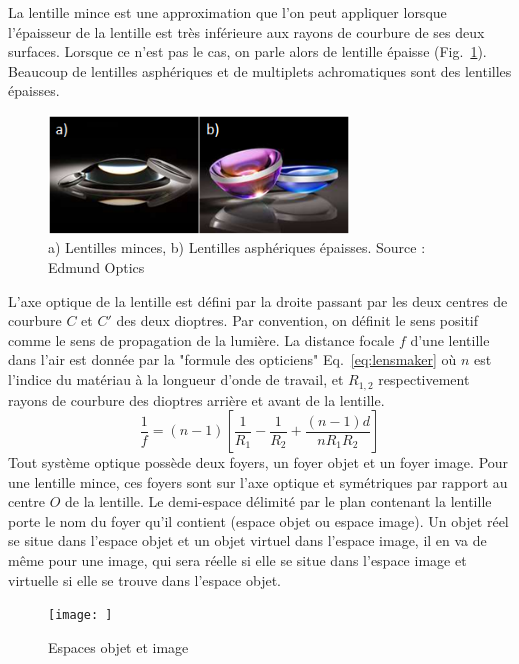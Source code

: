 \documentclass[a4paper]{book}
\begin{document}
La lentille mince est une approximation que l'on peut appliquer lorsque l'épaisseur de la lentille est très inférieure aux rayons de courbure de ses deux surfaces. Lorsque ce n'est pas le cas, on parle alors de lentille épaisse (Fig.~\ref{fig:lentille_mince}). Beaucoup de lentilles asphériques et de multiplets achromatiques sont des lentilles épaisses.
\begin{figure}[!htbp]
\begin{center}
\includegraphics[width=8cm]{lenses.PNG}
\end{center}
\caption{a) Lentilles minces, b) Lentilles asphériques épaisses. Source : \textcopyright Edmund Optics }
\label{fig:lentille_mince}
\end{figure}

L'axe optique de la lentille est défini par la droite passant par les deux centres de courbure $C$ et $C'$ des deux dioptres. Par convention, on définit le sens positif comme le sens de propagation de la lumière.  La distance focale $f$ d'une lentille dans l'air est donnée par la "formule des opticiens" Eq.~\ref{eq:lensmaker} où $n$ est l'indice du matériau à la longueur d'onde de travail, et $R_{1, 2}$ respectivement rayons de courbure des dioptres arrière et avant de la lentille. 
\begin{equation}
\label{eq:lensmaker}
\frac{1}{f}=(n-1)\left[\frac{1}{R_1}-\frac{1}{R_2}+\frac{(n-1)d}{n R_1 R_2}\right]
\end{equation}
Tout système optique possède deux foyers, un foyer objet et un foyer image. Pour une lentille mince, ces foyers sont sur l'axe optique et symétriques par rapport au centre $O$ de la lentille. Le demi-espace délimité par le plan contenant la lentille porte le nom du foyer qu'il contient (espace objet ou espace image). Un objet réel se situe dans l'espace objet et un objet virtuel dans l'espace image, il en va de même pour une image, qui sera réelle si elle se situe dans l'espace image et virtuelle si elle se trouve dans l'espace objet.
\begin{figure}[!htbp]
\begin{center}
\texttt{[image: ]}
\end{center}
\caption{Espaces objet et image}
\label{fig:espaces_lentille_mince}
\end{figure}
\end{document}
